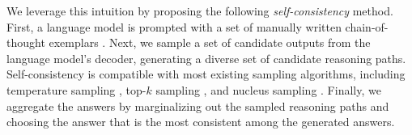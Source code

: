 \documentclass{article} %
\begin{document}


We leverage this intuition by proposing the following \textit{self-consistency} method.
First, a language model is prompted with a set of manually written chain-of-thought exemplars \citep{wei2022chain}.
Next, we sample a set of candidate outputs from the language model's decoder,  generating a diverse set of candidate reasoning paths. 
Self-consistency is compatible with most existing sampling algorithms, including temperature sampling \citep{ACKLEY1985147,ficler-goldberg-2017-controlling}, top-$k$ sampling \citep{fan-etal-2018-hierarchical,holtzman-etal-2018-learning,Radford2019LanguageMA}, and nucleus sampling \citep{nucleus_sampling}.
Finally, we aggregate the answers by marginalizing out the sampled reasoning paths and choosing the answer that is the most consistent among the generated answers.
\end{document}
